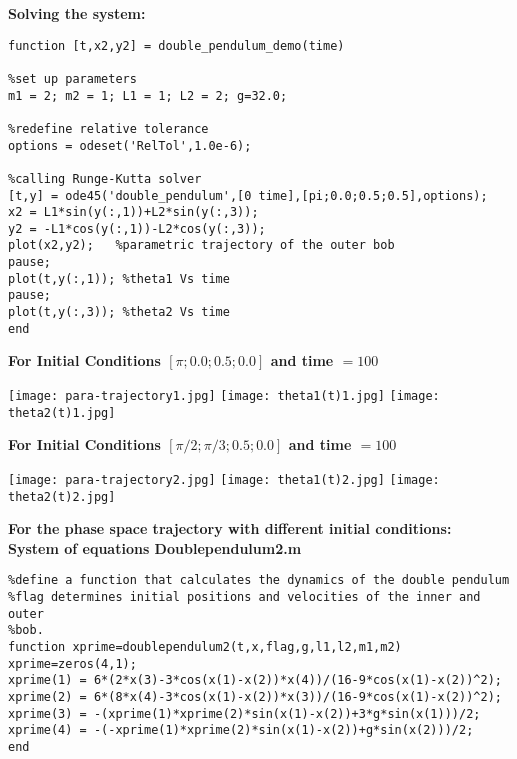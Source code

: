 \documentclass[11]{article}
\begin{document}
\noindent \textbf{Solving the system:}

\begin{verbatim}
function [t,x2,y2] = double_pendulum_demo(time)

%set up parameters 
m1 = 2; m2 = 1; L1 = 1; L2 = 2; g=32.0;

%redefine relative tolerance
options = odeset('RelTol',1.0e-6);

%calling Runge-Kutta solver
[t,y] = ode45('double_pendulum',[0 time],[pi;0.0;0.5;0.5],options);
x2 = L1*sin(y(:,1))+L2*sin(y(:,3));
y2 = -L1*cos(y(:,1))-L2*cos(y(:,3));
plot(x2,y2);   %parametric trajectory of the outer bob
pause;
plot(t,y(:,1)); %theta1 Vs time
pause;
plot(t,y(:,3)); %theta2 Vs time
end
\end{verbatim}

\newpage

\noindent \textbf{For Initial Conditions $[\pi;0.0;0.5;0.0]$ and time $=100$}

\begin{center}
\texttt{[image: para-trajectory1.jpg]}
\texttt{[image: theta1(t)1.jpg]}
\texttt{[image: theta2(t)1.jpg]}
\end{center}


\newpage

\noindent \textbf{For Initial Conditions $[\pi/2;\pi/3;0.5;0.0]$ and time $=100$}

\begin{center}
\texttt{[image: para-trajectory2.jpg]}
\texttt{[image: theta1(t)2.jpg]}
\texttt{[image: theta2(t)2.jpg]}
\end{center}

\newpage

\noindent \textbf{For the phase space trajectory with different initial conditions:}
\\

\noindent \textbf{System of equations
Doublependulum2.m}
\begin{verbatim}
%define a function that calculates the dynamics of the double pendulum
%flag determines initial positions and velocities of the inner and outer
%bob. 
function xprime=doublependulum2(t,x,flag,g,l1,l2,m1,m2)
xprime=zeros(4,1);
xprime(1) = 6*(2*x(3)-3*cos(x(1)-x(2))*x(4))/(16-9*cos(x(1)-x(2))^2);
xprime(2) = 6*(8*x(4)-3*cos(x(1)-x(2))*x(3))/(16-9*cos(x(1)-x(2))^2);
xprime(3) = -(xprime(1)*xprime(2)*sin(x(1)-x(2))+3*g*sin(x(1)))/2;
xprime(4) = -(-xprime(1)*xprime(2)*sin(x(1)-x(2))+g*sin(x(2)))/2;
end
\end{verbatim}
\end{document}
